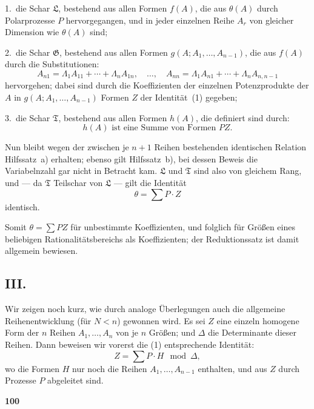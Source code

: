 \documentclass[12pt,a4paper]{article}
\begin{document}
1.\ die Schar $\mathfrak{L}$, bestehend aus allen Formen $f(A)$, die aus $\theta(A)$ durch Polarprozesse $P$ hervorgegangen, und in jeder einzelnen Reihe $A_r$ von gleicher Dimension wie $\theta(A)$ sind;

2.\ die Schar $\mathfrak{G}$, bestehend aus allen Formen $g(A; A_1, \ldots, A_{n-1})$, die aus $f(A)$ durch die Substitutionen:
\[A_{n1} = \Lambda_1 A_{11} + \cdots + \Lambda_n A_{1n}, \quad \ldots, \quad A_{nn} = \Lambda_1 A_{n1} + \cdots + \Lambda_n A_{n,n-1}\]
hervorgehen; dabei sind durch die Koeffizienten der einzelnen Potenzprodukte der $A$ in $g(A; A_1, \ldots, A_{n-1})$ Formen $Z$ der Identit\"at~(1) gegeben;

3.\ die Schar $\mathfrak{T}$, bestehend aus allen Formen $h(A)$, die definiert sind durch:
\[h(A) \text{ ist eine Summe von Formen } PZ.\]

Nun bleibt wegen der zwischen je $n+1$ Reihen bestehenden identischen Relation Hilfssatz~a) erhalten; ebenso gilt Hilfssatz~b), bei dessen Beweis die Variabelnzahl gar nicht in Betracht kam. $\mathfrak{L}$ und $\mathfrak{T}$ sind also von gleichem Rang, und --- da $\mathfrak{T}$ Teilschar von $\mathfrak{L}$ --- gilt die Identit\"at
\begin{equation}\tag{1}
\theta = \sum P \cdot Z
\end{equation}
identisch.

Somit $\theta = \sum PZ$ f\"ur unbestimmte Koeffizienten, und folglich f\"ur Gr\"o\ss en eines beliebigen Rationalit\"atsbereichs als Koeffizienten; der Reduktionssatz ist damit allgemein bewiesen.

\subsection*{III.}

Wir zeigen noch kurz, wie durch analoge \"Uberlegungen auch die allgemeine Reihenentwicklung (f\"ur $N < n$) gewonnen wird. Es sei $Z$ eine einzeln homogene Form der $n$ Reihen $A_1, \ldots, A_n$ von je $n$ Gr\"o\ss en; und $\Delta$ die Determinante dieser Reihen. Dann beweisen wir vorerst die (1) entsprechende Identit\"at:
\begin{equation}\tag{2}
Z = \sum P \cdot H \mod \Delta,
\end{equation}
wo die Formen $H$ nur noch die Reihen $A_1, \ldots, A_{n-1}$ enthalten, und aus $Z$ durch Prozesse $P$ abgeleitet sind.

\newpage
\begin{center}
\textbf{100}
\end{center}
\end{document}

